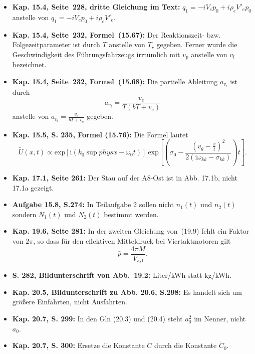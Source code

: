 \documentclass[11pt,a4paper]{scrartcl}
\providecommand{\gquote}[1]{\glqq #1\grqq}  %
\providecommand{\bdm}{\begin{displaymath}}
\providecommand{\edm}{\end{displaymath}}
\providecommand{\3}{{\ss}}
\providecommand{\gquote}[1]{\glqq #1\grqq}  %
\begin{document}
\begin{itemize}
\item
\textbf{Kap. 15.4, Seite~228, dritte Gleichung im Text:}
$q_1=-iV_ep_0+i\rho_eV'_e p_0$ anstelle von
$q_1=-iV_ep_0+i\rho_eV'_e$.

\item
\textbf{Kap. 15.4, Seite~232, Formel~(15.67):}
Der Reaktionszeit- bzw. Folgezeitparameter ist durch $T$ anstelle von $T_r$ gegeben. 
Ferner wurde die Geschwindigkeit des F\"uhrungsfahrzeugs irrt\"umlich mit $v_p$ anstelle von $v_l$ bezeichnet.

\item
\textbf{Kap. 15.4, Seite~232, Formel~(15.68):}
Die partielle Ableitung $a_{v_l}$ ist durch
\bdm
a_{v_l}=\frac{v_e}{T(bT+v_e)}
\edm
anstelle von $a_{v_l}=\frac{v_e}{bT+v_e}$ gegeben.

\item
\textbf{Kap. 15.5, S. 235, Formel (15.76):}
Die Formel lautet
\bdm
\tilde{U}(x, t) \propto  \text{exp} \left[ \text{i}(k_0\sup{phys} x-\omega_0 t) \right] \
\text{exp} \left[ \left(
 \sigma_0 
 -\frac{\left(v_g-\frac{x}{t}\right)^2}{2(\text{i}\omega_{kk}-\sigma_{kk})}\right) t
\right].
\edm


\item
\textbf{Kap. 17.1, Seite 261:}
Der Stau auf der A8-Ost ist in Abb. 17.1b, nicht 17.1a gezeigt.

\item
\textbf{Aufgabe 15.8, S.274:} In Teilaufgabe 2 sollen nicht $n_1(t)$ und $n_2(t)$ sondern $N_1(t)$ und $N_2(t)$ bestimmt werden.

\item
\textbf{Kap. 19.6, Seite 281:} In der zweiten Gleichung von~(19.9) fehlt ein Faktor von $2\pi$, so 
dass f\"ur den effektiven Mitteldruck bei Viertaktmotoren gilt 
\begin{equation*}
\bar{p}=\frac{4 \pi M}{V_\text{zyl}}.
\end{equation*}

\item
\textbf{S. 282, Bildunterschrift von Abb.~19.2:} \unit[11]{Liter/kWh} statt \unit[11]{kg/kWh}.

\item
\textbf{Kap. 20.5, Bildunterschrift zu Abb. 20.6, S.298:} Es handelt sich um gr\"o\3ere Einfahrten, nicht Ausfahrten.

\item
\textbf{Kap. 20.7, S. 299:} In den Gln (20.3) und (20.4) steht $a_0^2$ im Nenner, nicht $a_0$.

\item
\textbf{Kap. 20.7, S. 300:} Ersetze \gquote{die Konstante $\dot{C}$} durch \gquote{die Konstante $\dot{C}_0$}.


\end{itemize}
\end{document}
